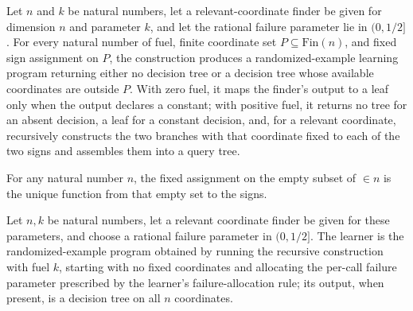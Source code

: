 \begin{definition}
\label{FABL.recursiveJuntaLearnerAux}
\leanok
{}
Let $n$ and $k$ be natural numbers, let a relevant-coordinate finder be given for
dimension $n$ and parameter $k$, and let the rational failure parameter lie in
$(0,1/2]$. For every natural number of fuel, finite coordinate set
$P\subseteq\mathrm{Fin}(n)$, and fixed sign assignment on $P$, the construction produces
a randomized-example learning program returning either no decision tree or a decision
tree whose available coordinates are outside $P$. With zero fuel, it maps the finder’s
output to a leaf only when the output declares a constant; with positive fuel, it
returns no tree for an absent decision, a leaf for a constant decision, and, for a
relevant coordinate, recursively constructs the two branches with that coordinate fixed
to each of the two signs and assembles them into a query tree.
\end{definition}

\begin{definition}
\label{FABL.emptyJuntaFixedAssignment}
\leanok
{}
For any natural number $n$, the fixed assignment on the empty subset of $\in n$ is the
unique function from that empty set to the signs.
\end{definition}

\begin{definition}
\label{FABL.recursiveJuntaLearner}
\leanok
{}
Let $n,k$ be natural numbers, let a relevant coordinate finder be given for these
parameters, and choose a rational failure parameter in $(0,1/2]$. The learner is the
randomized-example program obtained by running the recursive construction with fuel $k$,
starting with no fixed coordinates and allocating the per-call failure parameter
prescribed by the learner’s failure-allocation rule; its output, when present, is a
decision tree on all $n$ coordinates.
\end{definition}

